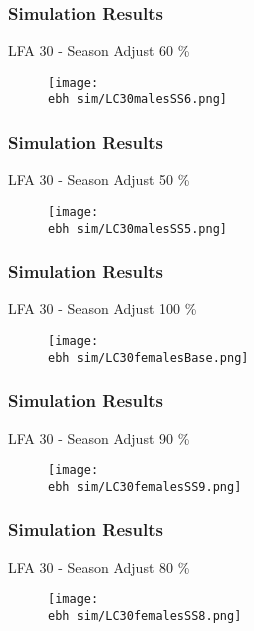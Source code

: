 \documentclass{beamer}
\newcommand{\ebh}{\string~/bio.data/bio.lobster/figures/LFA2733Framework2018/} %
\begin{document}
\begin{frame}
\frametitle{Simulation Results}
LFA 30 - Season Adjust 60 \%
\begin{figure}
        \begin{center}
            \texttt{[image: \\ebh sim/LC30malesSS6.png]}
        \end{center}
    \end{figure}
\end{frame}


\begin{frame}
\frametitle{Simulation Results}
LFA 30 - Season Adjust 50 \%
\begin{figure}
        \begin{center}
            \texttt{[image: \\ebh sim/LC30malesSS5.png]}
        \end{center}
    \end{figure}
\end{frame}




\begin{frame}
\frametitle{Simulation Results}
LFA 30 - Season Adjust 100 \%
\begin{figure}
        \begin{center}
            \texttt{[image: \\ebh sim/LC30femalesBase.png]}
        \end{center}
    \end{figure}
\end{frame}


\begin{frame}
\frametitle{Simulation Results}
LFA 30 - Season Adjust 90 \%
\begin{figure}
        \begin{center}
            \texttt{[image: \\ebh sim/LC30femalesSS9.png]}
        \end{center}
    \end{figure}
\end{frame}


\begin{frame}
\frametitle{Simulation Results}
LFA 30 - Season Adjust 80 \%
\begin{figure}
        \begin{center}
            \texttt{[image: \\ebh sim/LC30femalesSS8.png]}
        \end{center}
    \end{figure}
\end{frame}
\end{document}
